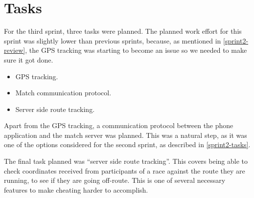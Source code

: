 \section{Tasks}
\label{sprint3-tasks}

For the third sprint, three tasks were planned. The planned work effort for this sprint was slightly lower than previous sprints, because, as mentioned in \autoref{sprint2-review}, the \ac{GPS} tracking was starting to become an issue so we needed to make sure it got done.

\begin{itemize}
 \item \ac{GPS} tracking.
 \item Match communication protocol.
 \item Server side route tracking.
\end{itemize}

Apart from the \ac{GPS} tracking, a communication protocol between the phone application and the match server was planned. This was a natural step, as it was one of the options considered for the second sprint, as described in \autoref{sprint2-tasks}.

The final task planned was ``server side route tracking''. This covers being able to check coordinates received from participants of a race against the route they are running, to see if they are going off-route. This is one of several necessary features to make cheating harder to accomplish.
